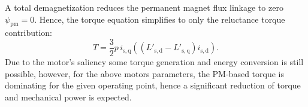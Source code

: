 \begin{solutionblock}
	A total demagnetization reduces the permanent magnet flux linkage to zero $\psi_{\mathrm{pm}}=0$. Hence, the torque equation simplifies to only the reluctance torque contribution:
	\[
		T=\frac{3}{2}p\,i_{\mathrm{s,q}}\left(\left(L'_{\mathrm{s,d}}-L'_{\mathrm{s,q}}\right)i_{\mathrm{s,d}}\right).
	\]
	Due to the motor's saliency some torque generation and energy conversion is still possible, however, for the above motors parameters, the PM-based torque is dominating for the given operating point, hence a significant reduction of torque and mechanical power is expected.
\end{solutionblock}